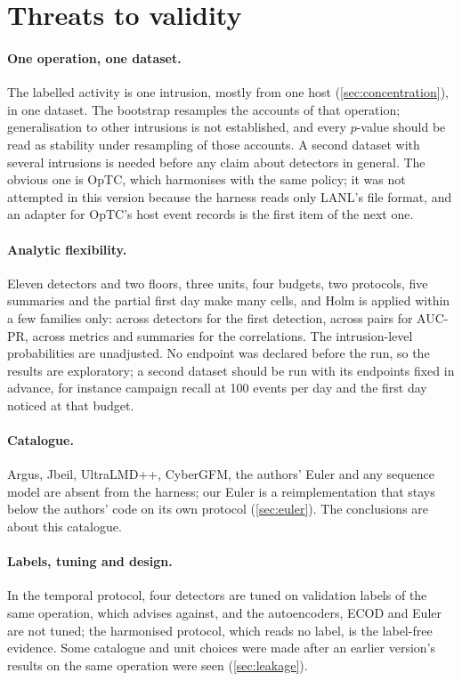 \documentclass[11pt,a4paper]{article}
\begin{document}
\section{Threats to validity}
\label{sec:threats}

\paragraph{One operation, one dataset.} The labelled activity is one intrusion, mostly from one host (\cref{sec:concentration}), in one dataset. The bootstrap resamples the accounts of that operation; generalisation to other intrusions is not established, and every $p$-value should be read as stability under resampling of those accounts. A second dataset with several intrusions is needed before any claim about detectors in general. The obvious one is OpTC, which \textcite{larroche2026fair} harmonises with the same policy; it was not attempted in this version because the harness reads only LANL's file format, and an adapter for OpTC's host event records is the first item of the next one.

\paragraph{Analytic flexibility.} Eleven detectors and two floors, three units, four budgets, two protocols, five summaries and the partial first day make many cells, and Holm is applied within a few families only: across detectors for the first detection, across pairs for AUC-PR, across metrics and summaries for the correlations. The intrusion-level probabilities are unadjusted. No endpoint was declared before the run, so the results are exploratory; a second dataset should be run with its endpoints fixed in advance, for instance campaign recall at 100 events per day and the first day noticed at that budget.

\paragraph{Catalogue.} Argus, Jbeil, UltraLMD++, CyberGFM, the authors' Euler and any sequence model are absent from the harness; our Euler is a reimplementation that stays below the authors' code on its own protocol (\cref{sec:euler}). The conclusions are about this catalogue.

\paragraph{Labels, tuning and design.} In the temporal protocol, four detectors are tuned on validation labels of the same operation, which \textcite{larroche2026fair} advises against, and the autoencoders, ECOD and Euler are not tuned; the harmonised protocol, which reads no label, is the label-free evidence. Some catalogue and unit choices were made after an earlier version's results on the same operation were seen (\cref{sec:leakage}).
\end{document}
